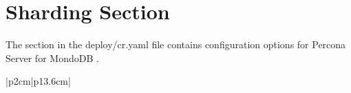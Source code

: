 \documentclass[letterpaper,10pt,english]{sphinxmanual}
\begin{document}
\section{Sharding Section}
\label{\detokenize{operator:operator-sharding-section}}\label{\detokenize{operator:id78}}
The  section in the deploy/cr.yaml file contains configuration
options for Percona Server for MondoDB {\hyperref[\detokenize{sharding:operator-sharding}]{}}.


\begin{savenotes}\sphinxatlongtablestart\begin{longtable}[c]{|p{2cm}|p{13.6cm}|}
\hline

\endfirsthead

%
{}\\
\hline

\endhead

\hline
{}\\
\endfoot

\endlastfoot


\end{longtable}
\end{savenotes}
\end{document}
